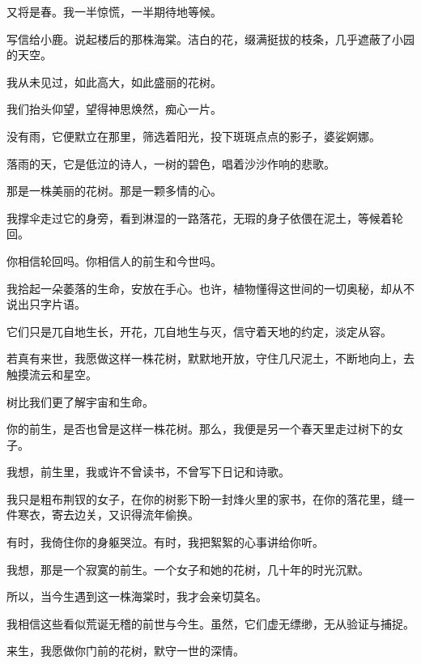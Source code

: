 		\vspace{1em}
		又将是春。我一半惊慌，一半期待地等候。\par
		写信给小鹿。说起楼后的那株海棠。洁白的花，缀满挺拔的枝条，几乎遮蔽了小园的天空。\par
		我从未见过，如此高大，如此盛丽的花树。\par
		我们抬头仰望，望得神思焕然，痴心一片。\par
		没有雨，它便默立在那里，筛选着阳光，投下斑斑点点的影子，婆娑婀娜。\par
		落雨的天，它是低泣的诗人，一树的碧色，唱着沙沙作响的悲歌。\par
		那是一株美丽的花树。那是一颗多情的心。\par
		我撑伞走过它的身旁，看到淋湿的一路落花，无瑕的身子依偎在泥土，等候着轮回。\par
		你相信轮回吗。你相信人的前生和今世吗。\par
		我拾起一朵萎落的生命，安放在手心。也许，植物懂得这世间的一切奥秘，却从不说出只字片语。\par
		它们只是兀自地生长，开花，兀自地生与灭，信守着天地的约定，淡定从容。\par
		若真有来世，我愿做这样一株花树，默默地开放，守住几尺泥土，不断地向上，去触摸流云和星空。\par
		树比我们更了解宇宙和生命。\par
		你的前生，是否也曾是这样一株花树。那么，我便是另一个春天里走过树下的女子。\par
		我想，前生里，我或许不曾读书，不曾写下日记和诗歌。\par
		我只是粗布荆钗的女子，在你的树影下盼一封烽火里的家书，在你的落花里，缝一件寒衣，寄去边关，又识得流年偷换。\par
		有时，我倚住你的身躯哭泣。有时，我把絮絮的心事讲给你听。\par
		我想，那是一个寂寞的前生。一个女子和她的花树，几十年的时光沉默。\par
		所以，当今生遇到这一株海棠时，我才会亲切莫名。\par
		我相信这些看似荒诞无稽的前世与今生。虽然，它们虚无缥缈，无从验证与捕捉。\par
		来生，我愿做你门前的花树，默守一世的深情。

